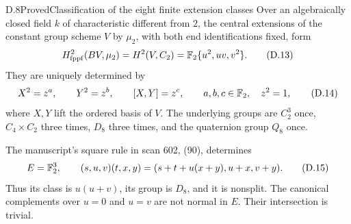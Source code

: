 \begin{statement}{D.8}{Proved}{Classification of the eight finite extension classes}
Over an algebraically closed field \(k\) of characteristic different
from \(2\), the central extensions of the constant group scheme
\(V\) by \(\mu _2\), with both end identifications fixed, form
\[
 H^2_{\mathrm{fppf}}(BV,\mu _2)=
 H^2(V,C_2)=\mathbb F_2\{u^2,uv,v^2\}.
 \tag{D.13}
\]
They are uniquely determined by
\[
 X^2=z^a,\qquad Y^2=z^b,\qquad [X,Y]=z^c,
 \qquad a,b,c\in\mathbb F_2,\quad z^2=1,
 \tag{D.14}
\]
where \(X,Y\) lift the ordered basis of \(V\).
The underlying groups are \(C_2^3\) once,
\(C_4\times C_2\) three times, \(D_8\) three times, and
the quaternion group \(Q_8\) once.

The manuscript's square rule in scan 602, (90), determines
\[
 E=\mathbb F_2^3,\qquad
 (s,u,v)(t,x,y)=(s+t+u(x+y),u+x,v+y).
 \tag{D.15}
\]
Thus its class is \(u(u+v)\), its group is \(D_8\), and it
is nonsplit.  The canonical complements over \(u=0\) and
\(u=v\) are not normal in \(E\).  Their intersection is trivial.
\end{statement}
